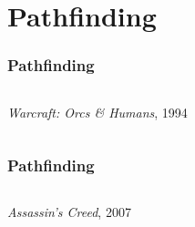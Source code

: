 \section{Pathfinding}

{%

\begin{frame}[plain,b]
	\frametitle{Pathfinding}
	\begin{columns}
		\column{0.45\paperwidth}
		\begin{block}{}
			\centering
			\textit{Warcraft: Orcs \& Humans}, 1994
		\end{block}
		\column{0.5\paperwidth}
	\end{columns}
\end{frame}
}

{%

\begin{frame}[plain,b]
	\frametitle{Pathfinding}
	\begin{columns}
		\column{0.45\paperwidth}
		\begin{block}{}
			\centering
			\textit{Assassin's Creed}, 2007
		\end{block}
		\column{0.5\paperwidth}
	\end{columns}
\end{frame}
}